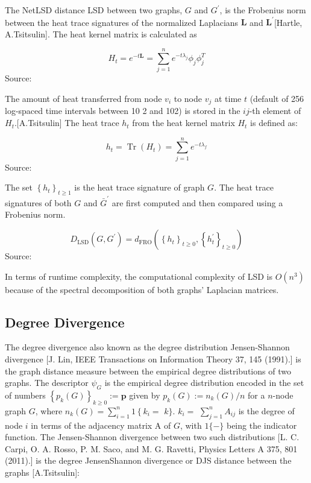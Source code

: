 The NetLSD distance LSD between two graphs, $G$ and $G^{\prime}$, is the Frobenius norm between the heat trace signatures of the normalized Laplacians $\mathbf{L}$ and $\mathbf{L}^{\prime}$[Hartle, A.Tsitsulin]. The heat kernel matrix is calculated as

\begin{equation}
H_{t}=e^{-t \mathbf{L}}=\sum_{j=1}^{n} e^{-t \lambda_{j}} \phi_{j} \phi_{j}^{T}
\end{equation}
Source: \cite{Tsitsulin:2018}

The amount of heat transferred from node $v_{i}$ to node $v_{j}$ at time $t$ (default of 256 log-spaced time intervals between 10 2 and 102) is stored in the $i j$-th element of $H_{t}$.[A.Tsitsulin] The heat trace $h_{t}$ from the heat kernel matrix $H_{t}$ is defined as:

\begin{equation}
h_{t}=\operatorname{Tr}\left(H_{t}\right)=\sum_{j=1}^{n} e^{-t \lambda_{f}}  
\end{equation}
Source: \cite{Tsitsulin:2018}

The set $\left\{h_{t}\right\}_{t \geq 1}$ is the heat trace signature of graph $G$. The heat trace signatures of both $G$ and $\bar{G}^{\prime}$ are first computed and then compared using a Frobenius norm.

\begin{equation}
D_{\mathrm{LSD}}\left(G, G^{\prime}\right)=d_{\mathrm{FRO}}\left(\left\{h_{t}\right\}_{t \geq 0},\left\{h_{t}^{\prime}\right\}_{t \geq 0}\right)
\end{equation}
Source: \cite{Tsitsulin:2018}

In terms of runtime complexity, the computational complexity of LSD is $O\left(n^{3}\right)$ because of the spectral decomposition of both graphs' Laplacian matrices.

\subsection{Degree Divergence}
The degree divergence also known as the degree distribution Jensen-Shannon divergence [J. Lin, IEEE Transactions on Information Theory 37, 145 (1991).] is the graph distance measure between the empirical degree distributions of two graphs. The descriptor $\psi_{G}$ is the empirical degree distribution encoded in the set of numbers $\left\{p_{k}(G)\right\}_{k \geq 0}:=\mathbf{p}$ given by $p_{k}(G):=n_{k}(G) /n$ for a $n$-node graph $G$, where $n_{k}(G)=\sum_{i=1}^{n} 1\left\{k_{i}=\right.$ $k\}$. $k_{i}=$ $\sum_{j=1}^{n} A_{i j}$ is the degree of node $i$ in terms of the adjacency matrix A of $G$, with $1\{-\}$ being the indicator function.  The Jensen-Shannon divergence between two such distributions [L. C. Carpi, O. A. Rosso, P. M. Saco, and M. G. Ravetti, Physics Letters A 375, 801 (2011).] is the degree JensenShannon divergence or DJS distance between the graphs [A.Tsitsulin]:

